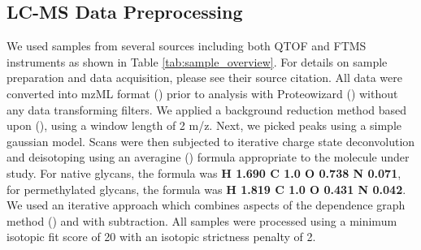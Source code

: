 \subsection{LC-MS Data Preprocessing}
    We used samples from several sources including both QTOF and FTMS instruments as shown
    in Table \ref{tab:sample_overview}. For details on sample preparation and data acquisition,
    please see their source citation. All data were converted into mzML format (\cite{Martens2011})
    prior to analysis with Proteowizard (\cite{Kessner2008}) without any data transforming filters.
    We applied a background reduction method based upon (\cite{Kaur2006}), using a window length
    of 2 m/z. Next, we picked peaks using a simple gaussian model. Scans were then subjected
    to iterative charge state deconvolution and deisotoping using an averagine (\cite{Senko1995})
    formula appropriate to the molecule under study. For native glycans, the formula was
    \textbf{H 1.690 C 1.0 O 0.738 N 0.071}, for permethylated glycans, the formula was
    \textbf{H 1.819 C 1.0 O 0.431 N 0.042}. We used an iterative approach which combines
    aspects of the dependence graph method (\cite{Liu2010}) and with subtraction. All samples
    were processed using a minimum isotopic fit score of 20 with an isotopic strictness penalty
    of 2.


